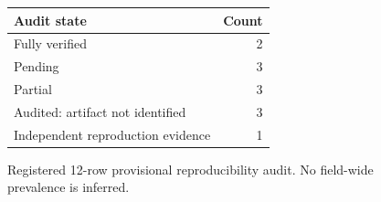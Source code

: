 \begin{figure}[H]\centering\begin{tabular}{lr}\toprule Audit state & Count\\\midrule Fully verified & 2\\ Pending & 3\\ Partial & 3\\ Audited: artifact not identified & 3\\ Independent reproduction evidence & 1\\\bottomrule\end{tabular}\caption{Registered 12-row provisional reproducibility audit. No field-wide prevalence is inferred.}\label{fig:reprocounts}\end{figure}